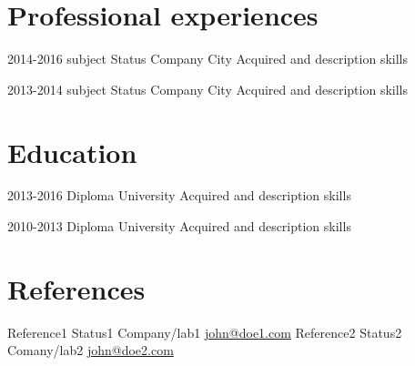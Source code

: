 \documentclass[]{friggeri-cv}
\begin{document}
\section{\faBriefcase\space Professional experiences}

	\begin{entrylist}


		\Experience
		{2014-2016}
		{subject}
		{Status}
		{Company}
		{City}
		{Acquired and description skills}


		\Experience
		{2013-2014}
		{subject}
		{Status}
		{Company}
		{City}
		{Acquired and description skills}


	\end{entrylist}


\section{\faBook\space Education}

	\begin{entrylist}


		\Education
		{2013-2016}
		{Diploma}
		{University}
		{Acquired and description skills}


		\Education
		{2010-2013}
		{Diploma}
		{University}
		{Acquired and description skills}


	\end{entrylist}


\section{\faEdit\space References}

	\begin{RefList}

		\Reference
		{Reference1}
		{Status1}
		{Company/lab1}
		{\href{mailto:john@doe1.com}{\faInbox\space john@doe1.com}}
		{Reference2}
		{Status2}
		{Comany/lab2}
		{\href{mailto:john@doe2.com}{\faInbox\space john@doe2.com}}

	\end{RefList}

\end{document}
